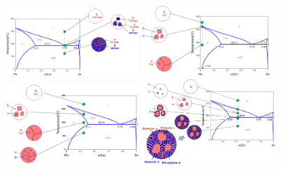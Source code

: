 \begin{figure}[t]
    \centering
    \includegraphics[width=0.45\textwidth]{Immagini/Pb-SnEvo1.png}
    \includegraphics[width=0.45\textwidth]{Immagini/Pb-SnEvo2.png}
    \includegraphics[width=0.45\textwidth]{Immagini/Pb-SnEvo3.png}
    \includegraphics[width=0.45\textwidth]{Immagini/Pb-SnEvo4.png}
\end{figure}
